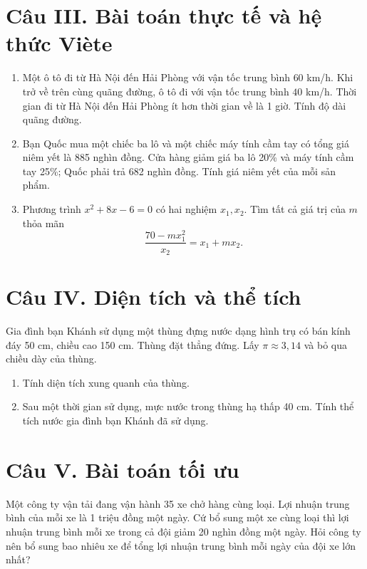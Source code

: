 \documentclass[12pt,a4paper]{article}
\begin{document}
\section*{Câu III. Bài toán thực tế và hệ thức Viète}
\begin{enumerate}
\item Một ô tô đi từ Hà Nội đến Hải Phòng với vận tốc trung bình $60$ km/h. Khi trở về trên cùng quãng đường, ô tô đi với vận tốc trung bình $40$ km/h. Thời gian đi từ Hà Nội đến Hải Phòng ít hơn thời gian về là 1 giờ. Tính độ dài quãng đường.
\item Bạn Quốc mua một chiếc ba lô và một chiếc máy tính cầm tay có tổng giá niêm yết là 885 nghìn đồng. Cửa hàng giảm giá ba lô 20\% và máy tính cầm tay 25\%; Quốc phải trả 682 nghìn đồng. Tính giá niêm yết của mỗi sản phẩm.
\item Phương trình $x^2+8x-6=0$ có hai nghiệm $x_1,x_2$. Tìm tất cả giá trị của $m$ thỏa mãn
\[
\frac{70-mx_1^2}{x_2}=x_1+mx_2.
\]
\end{enumerate}

\section*{Câu IV. Diện tích và thể tích}
Gia đình bạn Khánh sử dụng một thùng đựng nước dạng hình trụ có bán kính đáy 50 cm, chiều cao 150 cm. Thùng đặt thẳng đứng. Lấy $\pi\approx3{,}14$ và bỏ qua chiều dày của thùng.
\begin{enumerate}
\item Tính diện tích xung quanh của thùng.
\item Sau một thời gian sử dụng, mực nước trong thùng hạ thấp 40 cm. Tính thể tích nước gia đình bạn Khánh đã sử dụng.
\end{enumerate}

\section*{Câu V. Bài toán tối ưu}
Một công ty vận tải đang vận hành 35 xe chở hàng cùng loại. Lợi nhuận trung bình của mỗi xe là 1 triệu đồng một ngày. Cứ bổ sung một xe cùng loại thì lợi nhuận trung bình mỗi xe trong cả đội giảm 20 nghìn đồng một ngày. Hỏi công ty nên bổ sung bao nhiêu xe để tổng lợi nhuận trung bình mỗi ngày của đội xe lớn nhất?
\end{document}
